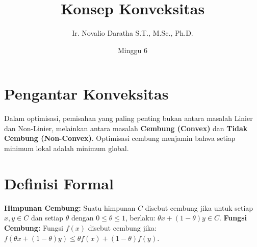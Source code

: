 \documentclass[11pt, a4paper]{article}
\title{\vspace{-1cm}\color{UNIBBlue}\textbf{Konsep Konveksitas}\vspace{-0.5cm}}
\author{Ir. Novalio Daratha S.T., M.Sc., Ph.D.}
\date{Minggu 6}
\begin{document}
\maketitle
\section{Pengantar Konveksitas}
Dalam optimisasi, pemisahan yang paling penting bukan antara masalah Linier dan Non-Linier, melainkan antara masalah \textbf{Cembung (Convex)} dan \textbf{Tidak Cembung (Non-Convex)}. Optimisasi cembung menjamin bahwa setiap minimum lokal adalah minimum global.
\section{Definisi Formal}
\textbf{Himpunan Cembung:} Suatu himpunan $C$ disebut cembung jika untuk setiap $x, y \in C$ dan setiap $\theta$ dengan $0 \le \theta \le 1$, berlaku:
$\theta x + (1 - \theta)y \in C$.
\textbf{Fungsi Cembung:} Fungsi $f(x)$ disebut cembung jika:
$f(\theta x + (1-\theta)y) \le \theta f(x) + (1-\theta)f(y)$.
\end{document}
